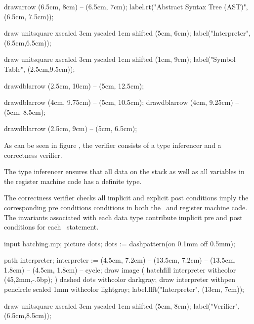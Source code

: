 drawarrow (6.5cm, 8cm)  -- (6.5cm, 7cm);
label.rt("Abstract Syntax Tree (AST)", (6.5cm, 7.5cm));

draw unitsquare xscaled 3cm yscaled 1cm shifted (5cm, 6cm);
label("Interpreter", (6.5cm,6.5cm));

draw unitsquare xscaled 3cm yscaled 1cm shifted (1cm, 9cm);
label("Symbol Table", (2.5cm,9.5cm));

drawdblarrow (2.5cm, 10cm) -- (5cm, 12.5cm);

drawdblarrow (4cm, 9.75cm) -- (5cm, 10.5cm);
drawdblarrow (4cm, 9.25cm) -- (5cm, 8.5cm);

drawdblarrow (2.5cm, 9cm)  -- (5cm, 6.5cm);
\stopMPcode\egroup

As can be seen in figure , the verifier consists of a 
type inferencer and a correctness verifier. 

\startitemize[2]

\item {}

The type inferencer ensures that all data on the stack as well as all 
variables in the register machine code has a definite type. 

\item {}

The correctness verifier checks all implicit and explicit post conditions 
imply the corresponding pre conditions conditions in both the \joylol\ and 
register machine code. The invariants associated with each data type 
contribute implicit pre and post conditions for each \joylol\ statement. 

\stopitemize

\item {}

\bgroup\startMPcode
input hatching.mp;
picture dots; dots := dashpattern(on 0.1mm off 0.5mm);

path interpreter;
interpreter := (4.5cm, 7.2cm)  -- (13.5cm, 7.2cm) --
               (13.5cm, 1.8cm) -- (4.5cm, 1.8cm)  -- cycle;
draw image (
  hatchfill interpreter
    withcolor (45,2mm,-.5bp);
) dashed dots withcolor darkgray;
draw interpreter
  withpen pencircle scaled 1mm
  withcolor lightgray;
label.llft("Interpreter", (13cm, 7cm));

draw unitsquare xscaled 3cm yscaled 1cm shifted (5cm, 8cm);
label("Verifier", (6.5cm,8.5cm));

